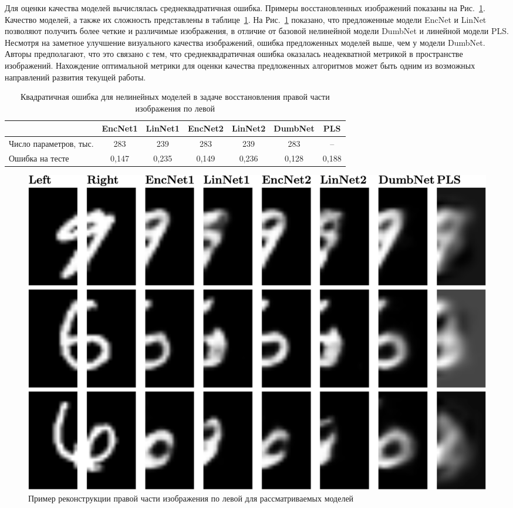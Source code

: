 Для оценки качества моделей вычислялась среднеквадратичная ошибка. Примеры восстановленных изображений показаны на Рис.~\ref{ch2:fig:mnist_nn_preds}. Качество моделей, а также их сложность представлены в таблице~\ref{ch2:tbl:mnist_nn_error}.
На Рис.~\ref{ch2:fig:mnist_nn_preds} показано, что предложенные модели EncNet и LinNet позволяют получить более четкие и различимые изображения, в отличие от базовой нелинейной модели DumbNet и линейной модели PLS.
Несмотря на заметное улучшение визуального качества изображений, ошибка предложенных моделей выше, чем у модели DumbNet.
Авторы предполагают, что это связано с тем, что среднеквадратичная ошибка оказалась неадекватной метрикой в пространстве изображений.
Нахождение оптимальной метрики для оценки качества предложенных алгоритмов может быть одним из возможных направлений развития текущей работы.

\begin{table}[ht]
	\caption{Квадратичная ошибка для нелинейных моделей в задаче восстановления правой части изображения по левой}
	\centering
	\small
	\begin{tabular}{l|cccccc}
	\hline
		& EncNet1 & LinNet1 & EncNet2 & LinNet2 & DumbNet & PLS\\  \hline
		Число параметров, тыс. & 283 & 239 & 283 & 239  & 283 & --\\
		Ошибка на тесте & 0,147 & 0,235 & 0,149 & 0,236 & 0,128 & 0,188 \\
		\hline
	\end{tabular}
	\label{ch2:tbl:mnist_nn_error}
\end{table}

\begin{figure}[ht]
	\centering 
	\includegraphics[width=\linewidth]{figs/ch2/mnist_preds}
	\caption{Пример реконструкции правой части изображения по левой для рассматриваемых моделей}
	\label{ch2:fig:mnist_nn_preds}
\end{figure}
